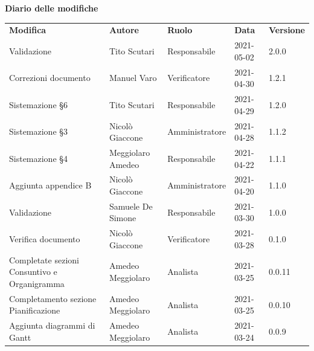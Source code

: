 \documentclass[a4paper]{article}
\begin{document}
\begin{center}
    \textbf{\Large Diario delle modifiche}\\
    \vspace{10px}
    \begin{table}[h!]
        \centering
        \renewcommand{\arraystretch}{1.8}
        \begin{tabular}{p{150px} p{90px} p{80px} p{60px} p{45px}}
            \rowcolor{logo!70} \textbf{Modifica}                          & \textbf{Autore}   & \textbf{Ruolo} & \textbf{Data} & \textbf{Versione} \\
            Validazione                                                   & Tito Scutari      & Responsabile   & 2021-05-02    & 2.0.0             \\
            Correzioni documento                                          & Manuel Varo       & Verificatore   & 2021-04-30    & 1.2.1             \\
            Sistemazione \S 6                                             & Tito Scutari      & Responsabile   & 2021-04-29    & 1.2.0             \\
            Sistemazione \S 3                                             & Nicolò Giaccone   & Amministratore & 2021-04-28    & 1.1.2             \\
            Sistemazione \S 4                                             & Meggiolaro Amedeo & Responsabile   & 2021-04-22    & 1.1.1             \\
            Aggiunta appendice B                                          & Nicolò Giaccone   & Amministratore & 2021-04-20    & 1.1.0             \\
            Validazione                                                   & Samuele De Simone & Responsabile   & 2021-03-30    & 1.0.0             \\
            Verifica documento                                            & Nicolò Giaccone   & Verificatore   & 2021-03-28    & 0.1.0             \\
            Completate sezioni Consuntivo e Organigramma                  & Amedeo Meggiolaro & Analista       & 2021-03-25    & 0.0.11            \\
            Completamento sezione Pianificazione                          & Amedeo Meggiolaro & Analista       & 2021-03-25    & 0.0.10            \\
            Aggiunta diagrammi di Gantt                                   & Amedeo Meggiolaro & Analista       & 2021-03-24    & 0.0.9             \\

\end{tabular}
\end{table}
\end{center}
\end{document}
